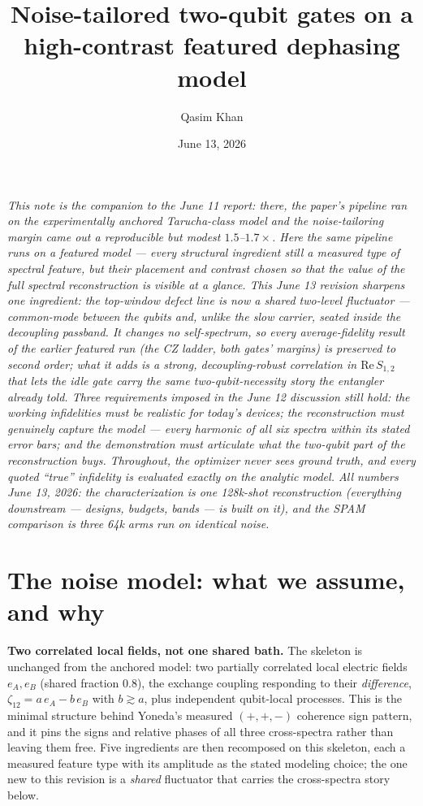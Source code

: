 \documentclass[10pt]{article}
\title{\vspace{-1.5em}Noise-tailored two-qubit gates on a high-contrast
featured dephasing model\vspace{-0.4em}}
\author{Qasim Khan}
\date{June 13, 2026}
\begin{document}
\maketitle
\vspace{-1.8em}

\textit{This note is the companion to the June 11 report: there, the paper's
pipeline ran on the experimentally anchored Tarucha-class model and the
noise-tailoring margin came out a reproducible but modest $1.5$--$1.7\times$.
Here the same pipeline runs on a \emph{featured} model --- every structural
ingredient still a measured type of spectral feature, but their placement and
contrast chosen so that the value of the full spectral reconstruction is
visible at a glance. This June 13 revision sharpens one ingredient: the
top-window defect line is now a \emph{shared} two-level fluctuator ---
common-mode between the qubits and, unlike the slow carrier, seated inside the
decoupling passband. It changes no self-spectrum, so every average-fidelity
result of the earlier featured run (the CZ ladder, both gates' margins) is
preserved to second order; what it adds is a strong, decoupling-robust
correlation in $\mathrm{Re}\,S_{1,2}$ that lets the \emph{idle} gate carry the
same two-qubit-necessity story the entangler already told. Three requirements
imposed in the June 12 discussion still hold: the working infidelities must be
realistic for today's devices; the reconstruction must genuinely capture the
model --- every harmonic of all six spectra within its stated error bars; and
the demonstration must articulate what the two-qubit part of the
reconstruction buys. Throughout, the optimizer never sees ground truth, and
every quoted ``true'' infidelity is evaluated exactly on the analytic model.
All numbers June 13, 2026: the characterization is one 128k-shot
reconstruction (everything downstream --- designs, budgets, bands --- is built
on it), and the SPAM comparison is three 64k arms run on identical noise.}

\section{The noise model: what we assume, and why}\label{sec:model}

\textbf{Two correlated local fields, not one shared bath.} The skeleton is
unchanged from the anchored model: two partially correlated local electric
fields $e_A, e_B$ (shared fraction 0.8), the exchange coupling responding to
their \emph{difference}, $\zeta_{12} = a\,e_A - b\,e_B$ with $b \gtrsim a$,
plus independent qubit-local processes. This is the minimal structure behind
Yoneda's measured $(+,+,-)$ coherence sign pattern, and it pins the signs and
relative phases of all three cross-spectra rather than leaving them free.
Five ingredients are then recomposed on this skeleton, each a measured
feature type with its amplitude as the stated modeling choice; the one new
to this revision is a \emph{shared} fluctuator that carries the cross-spectra
story below.
\end{document}
